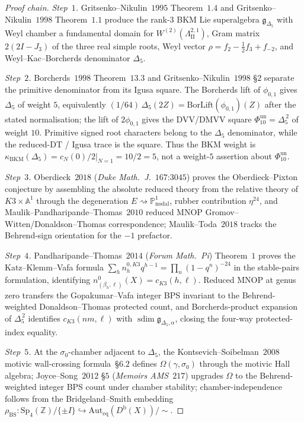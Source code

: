 \begin{proof}[Proof chain]
\emph{Step~$1$.} Gritsenko--Nikulin~$1995$ Theorem~$1.4$ and Gritsenko--Nikulin~$1998$ Theorem~$1.1$ produce the rank-$3$ BKM Lie superalgebra $\mathfrak{g}_{\Delta_5}$ with Weyl chamber a fundamental domain for $W^{(2)}(\Lambda^{2, 1}_{\mathrm{II}})$, Gram matrix $2(2I - J_3)$ of the three real simple roots, Weyl vector $\rho = f_2 - \tfrac{1}{2} f_3 + f_{-2}$, and Weyl--Kac--Borcherds denominator $\Delta_5$.

\emph{Step~$2$.} Borcherds~$1998$ Theorem~$13.3$ and Gritsenko--Nikulin~$1998$ \S$2$ separate the primitive denominator from its Igusa square. The Borcherds lift of $\phi_{0,1}$ gives $\Delta_5$ of weight $5$, equivalently $(1/64)\,\Delta_5(2Z) = \mathrm{BorLift}(\phi_{0,1})(Z)$ after the stated normalisation; the lift of $2\phi_{0,1}$ gives the DVV/DMVV square \(\Phi_{10}^{\mathrm{un}}=\Delta_5^{\,2}\) of weight $10$. Primitive signed root characters belong to the $\Delta_5$ denominator, while the reduced-DT / Igusa trace is the square. Thus the BKM weight is $\kappa_{\mathrm{BKM}}(\Delta_5) = \left.c_N(0)/2\right|_{N=1} = 10/2 = 5$, not a weight-$5$ assertion about \(\Phi_{10}^{\mathrm{un}}\).

\emph{Step~$3$.} Oberdieck~$2018$ (\emph{Duke Math.\ J.}~$167$:$3045$) proves the Oberdieck--Pixton conjecture by assembling the absolute reduced theory from the relative theory of $K3 \times \mathbb{A}^1$ through the degeneration $E \rightsquigarrow \mathbb{P}^1_{\mathrm{nodal}}$, rubber contribution $\eta^{24}$, and Maulik--Pandharipande--Thomas~$2010$ reduced MNOP Gromov--Witten/Donaldson--Thomas correspondence; Maulik--Toda~$2018$ tracks the Behrend-sign orientation for the $-1$ prefactor.

\emph{Step~$4$.} Pandharipande--Thomas~$2014$ (\emph{Forum Math.\ Pi}) Theorem~$1$ proves the Katz--Klemm--Vafa formula $\sum_h n^{0, K3}_h q^{h - 1} = \prod_n (1 - q^n)^{-24}$ in the stable-pairs formulation, identifying $n^{0}_{(\beta_h, \ell)}(X) = c_{K3}(h, \ell)$. Reduced MNOP at genus zero transfers the Gopakumar--Vafa integer BPS invariant to the Behrend-weighted Donaldson--Thomas protected count, and Borcherds-product expansion of $\Delta_5^{\,2}$ identifies $c_{K3}(nm, \ell)$ with \(\operatorname{sdim}\mathfrak{g}_{\Delta_5,\alpha}\), closing the four-way protected-index equality.

\emph{Step~$5$.} At the $\sigma_0$-chamber adjacent to $\Delta_5$, the Kontsevich--Soibelman~$2008$ motivic wall-crossing formula~\S$6.2$ defines $\Omega(\gamma, \sigma_0)$ through the motivic Hall algebra; Joyce--Song~$2012$ \S$5$ (\emph{Memoirs AMS~$217$}) upgrades $\Omega$ to the Behrend-weighted integer BPS count under chamber stability; chamber-independence follows from the Bridgeland--Smith embedding $\rho_{\mathrm{BS}}: \mathrm{Sp}_4(\mathbb{Z})/\{\pm I\} \hookrightarrow \mathrm{Aut}_{\mathrm{eq}}(D^{\mathrm{b}}(X))/{\sim}$.
\end{proof}

